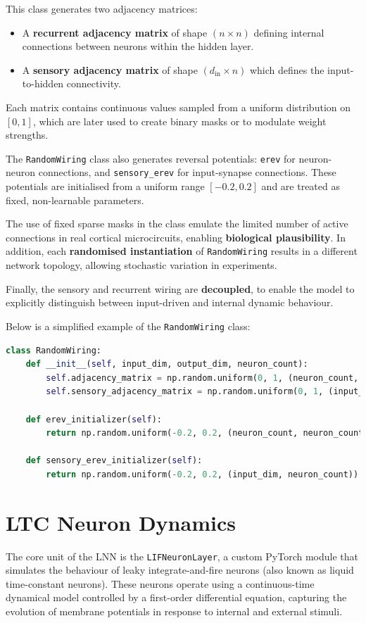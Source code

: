 This class generates two adjacency matrices:
\begin{itemize}
    \item A \textbf{recurrent adjacency matrix} of shape $(n \times n)$ defining internal connections between neurons within the hidden layer.
    \item A \textbf{sensory adjacency matrix} of shape $(d_{\text{in}} \times n)$ which defines the input-to-hidden connectivity.
\end{itemize}
Each matrix contains continuous values sampled from a uniform distribution on $[0, 1]$, which are later used to create binary masks or to modulate weight strengths.

The \texttt{RandomWiring} class also generates reversal potentials: \texttt{erev} for neuron-neuron connections, and \texttt{sensory\_erev} for input-synapse connections. These potentials are initialised from a uniform range $[-0.2, 0.2]$ and are treated as fixed, non-learnable parameters.

The use of fixed sparse masks in the class emulate the limited number of active connections in real cortical microcircuits, enabling \textbf{biological plausibility}. In addition, each \textbf{randomised instantiation} of \texttt{RandomWiring} results in a different network topology, allowing stochastic variation in experiments.

Finally, the sensory and recurrent wiring are \textbf{decoupled}, to enable the model to explicitly distinguish between input-driven and internal dynamic behaviour.

Below is a simplified example of the \texttt{RandomWiring} class:
\begin{lstlisting}[language=Python, caption={Simplified RandomWiring class}]
class RandomWiring:
    def __init__(self, input_dim, output_dim, neuron_count):
        self.adjacency_matrix = np.random.uniform(0, 1, (neuron_count, neuron_count))
        self.sensory_adjacency_matrix = np.random.uniform(0, 1, (input_dim, neuron_count))
        
    def erev_initializer(self):
        return np.random.uniform(-0.2, 0.2, (neuron_count, neuron_count))

    def sensory_erev_initializer(self):
        return np.random.uniform(-0.2, 0.2, (input_dim, neuron_count))
\end{lstlisting}

\section{LTC Neuron Dynamics}
The core unit of the LNN is the \texttt{LIFNeuronLayer}, a custom PyTorch module that simulates the behaviour of leaky integrate-and-fire neurons (also known as liquid time-constant neurons). These neurons operate using a continuous-time dynamical model controlled by a first-order differential equation, capturing the evolution of membrane potentials in response to internal and external stimuli.


